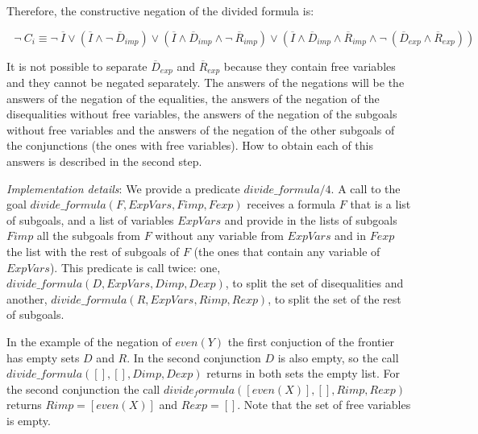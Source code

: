 \documentclass{tlp}
\begin{document}
Therefore, the constructive negation of the divided formula is:


\noindent
$ ~~~\neg~C_i \equiv \neg~\overline{I} \vee
 (\overline{I} \wedge
\neg~\overline{D}_{imp}) \vee 
(\overline{I} \wedge \overline{D}_{imp}
\wedge \neg~\overline{R}_{imp}) \vee
( \overline{I} \wedge
\overline{D}_{imp} \wedge \overline{R}_{imp} \wedge
\neg~(\overline{D}_{exp} \wedge \overline{R}_{exp})) $
\noindent

It is not possible to separate $\overline{D}_{exp}$ and
$\overline{R}_{exp}$ because they contain free variables and
they cannot be negated separately. The answers of the negations
will be the answers of the negation of the equalities, the answers of
the negation of the disequalities without free variables, the answers
of the negation of the subgoals without free variables and the answers
of the negation of the other subgoals of the conjunctions (the ones
with free variables). How to obtain each of this answers is described in the
second step.

\noindent
\emph{Implementation details}: We provide a predicate $divide\_formula/4$. A
call to the goal $divide\_formula(F,ExpVars,Fimp,Fexp)$ receives a formula $F$
that is a list of subgoals, and a list of variables $ExpVars$ and provide in
the lists of subgoals $Fimp$ all the subgoals from $F$ without any variable
from $ExpVars$ and in $Fexp$ the list with the rest of subgoals of $F$ (the
ones that contain any variable of $ExpVars$). This predicate is call twice:
one, $divide\_formula(D,ExpVars,Dimp,Dexp)$, to split the set of disequalities
and another, $divide\_formula(R,ExpVars,Rimp,Rexp)$, to split the set of the
rest of subgoals.

In the example of the negation of $even(Y)$ the first conjuction of the
frontier has empty sets $D$ and $R$. In the second conjunction $D$ is also 
empty, so the call $divide\_formula([],[],Dimp,Dexp)$ returns in both sets the
empty list. For the second conjunction the call
$divide_formula([even(X)],[],Rimp,Rexp)$ returns $Rimp=[even(X)]$ and
$Rexp=[]$. Note that the set of free variables is empty.
\end{document}

